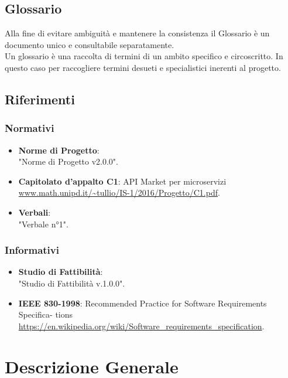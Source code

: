 \documentclass[12pt,a4paper,titlepage]{article}
\begin{document}
	\subsection{Glossario}
	Alla fine di evitare ambiguità e mantenere la consistenza il Glossario è un documento unico e consultabile separatamente.\\
	Un glossario è una raccolta di termini di un ambito specifico e circoscritto. In questo caso per raccogliere termini desueti e specialistici inerenti al progetto. 
	
	\subsection{Riferimenti}
	\subsubsection{Normativi}
	\begin{itemize}
		\item \textbf{Norme di Progetto}:\\	
		"Norme di Progetto v2.0.0".
		\item \textbf{Capitolato d'appalto C1}:	API Market per microservizi \\
		\textcolor{blue}{\url{www.math.unipd.it/~tullio/IS-1/2016/Progetto/C1.pdf}}. 
		\item \textbf{Verbali}:\\
		"Verbale n°1".
	\end{itemize}	
	\subsubsection{Informativi}
	\begin{itemize}
		\item \textbf {Studio di Fattibilità}:\\ 
		"Studio di Fattibilità v.1.0.0".
		\item \textbf{IEEE 830-1998}: Recommended Practice for Software Requirements Specifica- tions \\
		\textcolor{blue}{\url{https://en.wikipedia.org/wiki/Software_requirements_specification}}.
	\end{itemize}
	
	\newpage
	
	\section{Descrizione Generale}
\end{document}
